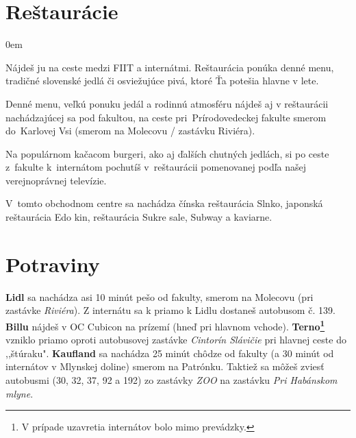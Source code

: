 \section{Reštaurácie}
\begin{description}
\itemsep0em 
\item [{Mlynská koliba}] Nájdeš ju na ceste medzi FIIT a internátmi. Reštaurácia
ponúka denné menu, tradičné slovenské jedlá či osviežujúce pivá, ktoré Ťa potešia hlavne v lete. \Smiley
\item [{Reštaurácia Drag}] Denné menu, veľkú ponuku jedál a rodinnú atmosféru nájdeš aj v reštaurácii nachádzajúcej sa pod fakultou, na ceste pri~Prí\-ro\-dovedeckej fakulte smerom do~Karlovej Vsi (smerom na Molecovu / zastávku Riviéra).
\item [{EstéVéčka}] Na populárnom kačacom burgeri, ako aj ďalších chutných jedlách, si po ceste z~fakulte k~internátom pochutíš v~reštaurácii pomenovanej podľa našej verejnoprávnej televízie.
\item [{Cubicon}] V~tomto obchodnom centre sa nachádza čínska reštaurácia Slnko, japonská reštaurácia Edo kin, reštaurácia Sukre sale, Subway a kaviarne.

\end{description}

\section{Potraviny}
	\textbf{Lidl} sa nachádza asi 10 minút pešo od fakulty, smerom na Molecovu (pri zastávke \emph{Riviéra}). Z internátu sa k priamo k Lidlu dostaneš autobusom č. 139. \textbf{Billu} nájdeš v OC Cubicon na prízemí (hneď pri hlavnom vchode).
	\textbf{Terno\footnote{V prípade uzavretia internátov bolo mimo prevádzky.}}  vzniklo priamo oproti autobusovej zastávke \emph{Cintorín Slávičie} pri hlavnej ceste do ,,štúraku". \textbf{Kaufland} sa nachádza  25 minút chôdze od fakulty (a 30 minút od internátov v Mlynskej doline) smerom na Patrónku. Taktiež sa môžeš zviesť autobusmi (30, 32, 37, 92 a 192) zo zastávky \emph{ZOO} na zastávku \emph{Pri Habánskom mlyne}.


